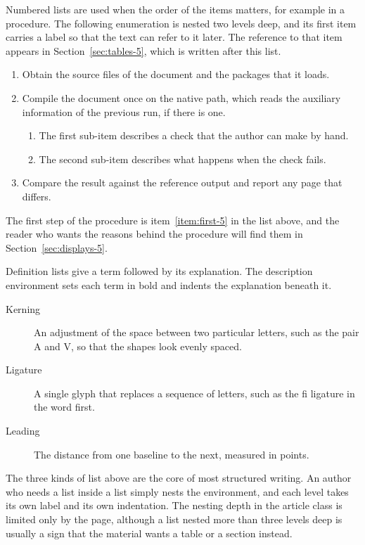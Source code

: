 \documentclass{article}
\begin{document}
Numbered lists are used when the order of the items matters, for example in a
procedure. The following enumeration is nested two levels deep, and its first item
carries a label so that the text can refer to it later. The reference to that item
appears in Section~\ref{sec:tables-5}, which is written after this list.

\begin{enumerate}
  \item\label{item:first-5} Obtain the source files of the document and the packages that
        it loads.
  \item Compile the document once on the native path, which reads the auxiliary
        information of the previous run, if there is one.
        \begin{enumerate}
          \item The first sub-item describes a check that the author can make by hand.
          \item The second sub-item describes what happens when the check fails.
        \end{enumerate}
  \item Compare the result against the reference output and report any page that
        differs.
\end{enumerate}

The first step of the procedure is item~\ref{item:first-5} in the list above, and the
reader who wants the reasons behind the procedure will find them in
Section~\ref{sec:displays-5}.

Definition lists give a term followed by its explanation. The description environment
sets each term in bold and indents the explanation beneath it.

\begin{description}
  \item[Kerning] An adjustment of the space between two particular letters, such as
        the pair A and V, so that the shapes look evenly spaced.
  \item[Ligature] A single glyph that replaces a sequence of letters, such as the
        fi ligature in the word first.
  \item[Leading] The distance from one baseline to the next, measured in points.
\end{description}

The three kinds of list above are the core of most structured writing. An author who
needs a list inside a list simply nests the environment, and each level takes its own
label and its own indentation. The nesting depth in the article class is limited only
by the page, although a list nested more than three levels deep is usually a sign that
the material wants a table or a section instead.
\end{document}
